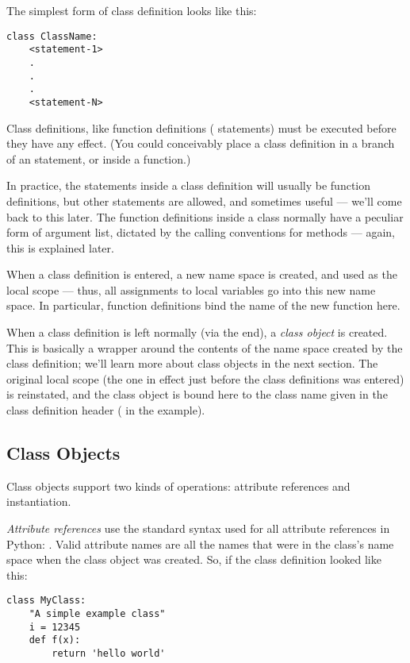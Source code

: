 \documentclass{manual}
\begin{document}
The simplest form of class definition looks like this:

\begin{verbatim}
class ClassName:
    <statement-1>
    .
    .
    .
    <statement-N>
\end{verbatim}

Class definitions, like function definitions
( statements) must be executed before they have any
effect.  (You could conceivably place a class definition in a branch
of an  statement, or inside a function.)

In practice, the statements inside a class definition will usually be
function definitions, but other statements are allowed, and sometimes
useful --- we'll come back to this later.  The function definitions
inside a class normally have a peculiar form of argument list,
dictated by the calling conventions for methods --- again, this is
explained later.

When a class definition is entered, a new name space is created, and
used as the local scope --- thus, all assignments to local variables
go into this new name space.  In particular, function definitions bind
the name of the new function here.

When a class definition is left normally (via the end), a \emph{class
object} is created.  This is basically a wrapper around the contents
of the name space created by the class definition; we'll learn more
about class objects in the next section.  The original local scope
(the one in effect just before the class definitions was entered) is
reinstated, and the class object is bound here to the class name given
in the class definition header ( in the example).


\subsection{Class Objects \label{classObjects}}

Class objects support two kinds of operations: attribute references
and instantiation.

\emph{Attribute references} use the standard syntax used for all
attribute references in Python: .  Valid attribute
names are all the names that were in the class's name space when the
class object was created.  So, if the class definition looked like
this:

\begin{verbatim}
class MyClass:
    "A simple example class"
    i = 12345
    def f(x):
        return 'hello world'
\end{verbatim}
\end{document}
